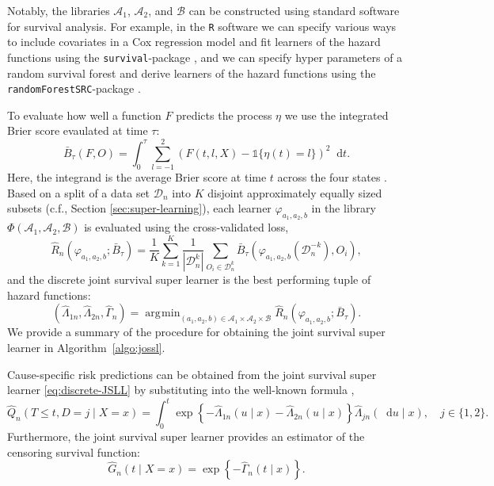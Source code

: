 \documentclass[alpha-refs]{wiley-article}
\renewcommand{\phi}{\varphi}
\newcommand*\diff{\mathop{}\!\mathrm{d}}
\newcommand{\1}{\mathbb{1}}
\DeclareMathOperator*{\argmin}{\arg\!\min}
\newcommand{\data}{\ensuremath{\mathcal{D}}}
\begin{document}
  Notably, the libraries \( \mathcal{A}_1 \), \(
\mathcal{A}_2 \), and \( \mathcal{B} \) can be constructed using
standard software for survival analysis.  For example, in the
\texttt{R} software we can specify various ways to include covariates
in a Cox regression model and fit learners of the hazard functions
using the \texttt{survival}-package \citep{survival-package}, and we
can specify hyper parameters of a random survival forest and derive
learners of the hazard functions using the
\texttt{randomForestSRC}-package \citep{randomForestSRC}.

To evaluate how well a function \( F \) predicts the
process $\eta$ we use the integrated Brier score \citep{graf1999assessment}
evaulated at time \(\tau\):
\begin{equation*}
  \bar B_\tau(F,O) = \int_0^{\tau} \sum_{l=-1}^{2}
  \left(
      F(t,l,X) - \1{\{\eta(t)=l\}}
  \right)^2\diff t.
\end{equation*}
Here, the integrand is the average Brier score at time \(t\) across
the four states \citep{brier1950verification}. Based on a split of a
data set \(\data_n\) into $K$ disjoint approximately equally sized
subsets (c.f., Section \ref{sec:super-learning}), each learner \(
\phi_{a_1, a_2, b} \) in the library \( \Phi(\mathcal{A}_1,
\mathcal{A}_2, \mathcal{B}) \) is evaluated using the cross-validated
loss,
\begin{equation*}
  \hat{R}_{n}(\phi_{a_1,a_2,b} ; \bar{B}_{\tau}) =
  \frac{1}{K}\sum_{k=1}^{K}
  \frac{1}{| \data_n^{k} |}\sum_{O_i \in \data_n^{k}}
  \bar B_\tau
  {
    \left(
      \phi_{a_1,a_2,b}{ (\data_n^{-k})}
      , O_i
    \right)
  },
\end{equation*}
and the discrete joint survival super learner is the best performing tuple of hazard functions:
\begin{equation}\label{eq:discrete-JSLL}
  (\hat \Lambda_{1n},\hat \Lambda_{2n}, \hat \Gamma_{n})
  =  \argmin_{(a_1,a_2,b)\in \mathcal{A}_1\times\mathcal{A}_2\times\mathcal{B}}
  \hat{R}_{n}(\phi_{a_1,a_2,b} ; \bar{B}_{\tau}).
\end{equation}
We provide a summary of the procedure for obtaining the joint survival
super learner in Algorithm~\ref{algo:jossl}.
  
Cause-specific risk predictions can be obtained from
the joint survival super learner \eqref{eq:discrete-JSLL} by
substituting into the well-known formula
\citep[e.g.,][]{benichou1990estimates, ozenne2017riskregression},
\begin{equation}
  \label{eq:cs-risk-def} \hat Q_n(T \leq t, D = j \mid X=x) = \int_0^t
\exp\left\{-\hat\Lambda_{1n}(u \mid x)-\hat\Lambda_{2n}(u \mid
x)\right\} \hat\Lambda_{jn}(\diff u \mid x), \quad j \in \{1,2\}.
\end{equation} Furthermore, the joint survival super learner provides an
estimator of the censoring survival function:
\begin{equation}\label{eq:estimate-G}
 \hat G_n(t \mid X=x) = \exp\left\{-\hat\Gamma_n(t \mid x)\right\}.
\end{equation}
\end{document}
